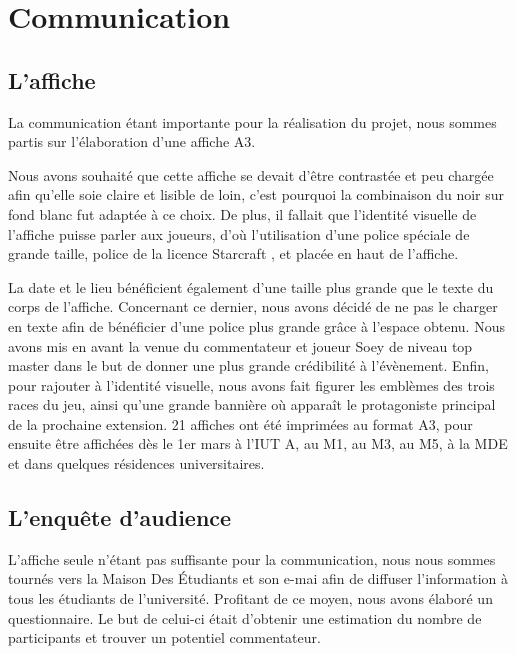 \section{Communication}%
\label{sec:communication}

\subsection{L'affiche}%
\label{sub:l_affiche}

La communication étant importante pour la réalisation du projet, nous sommes partis sur l'élaboration
d'une affiche A3.

Nous avons souhaité que cette affiche se devait d’être contrastée et peu chargée afin qu’elle soie
claire et lisible de loin, c’est pourquoi la combinaison du noir sur fond blanc fut adaptée à ce choix.
De plus, il fallait que l’identité visuelle de l’affiche puisse parler aux joueurs, d’où l’utilisation
d’une police spéciale de grande taille, police de la licence \og Starcraft \fg{}, et placée en haut de l’affiche.

La date et le lieu bénéficient également d’une taille plus grande que le texte du corps de l’affiche.
Concernant ce dernier, nous avons décidé de ne pas le charger en texte afin de bénéficier d’une police
plus grande grâce à l’espace obtenu.
Nous avons mis en avant la venue du commentateur et joueur Soey  de niveau \og top master \fg{}  dans le but
de donner une plus grande crédibilité à l’évènement.
Enfin, pour rajouter à l’identité visuelle, nous avons fait figurer  les emblèmes des trois races du jeu,
ainsi qu’une grande bannière où apparaît le protagoniste principal de la prochaine extension.
21 affiches ont été imprimées au format A3, pour ensuite être affichées dès le 1er mars à l’IUT A, au M1,
au M3, au M5, à la MDE et dans quelques résidences universitaires.

\subsection{L'enquête d'audience}%
\label{sub:l_enquete_d_audience}

L'affiche seule n'étant pas suffisante pour la communication, nous nous sommes tournés vers la
Maison Des Étudiants et son e-mai afin de diffuser l'information à tous les étudiants de l'université.
Profitant de ce moyen, nous avons élaboré un questionnaire. Le but de celui-ci était d'obtenir une estimation
du nombre de participants et trouver un potentiel commentateur.

